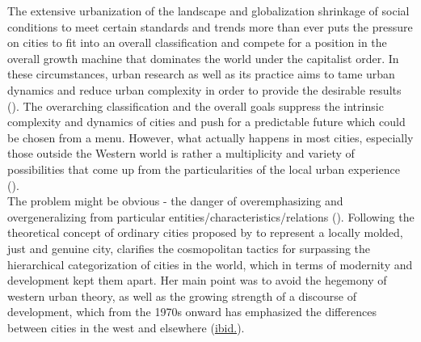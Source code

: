 \documentclass[11pt]{report}
\begin{document}
{{{The extensive urbanization of the landscape and globalization shrinkage of social conditions to meet certain standards and trends more than ever puts the pressure on cities to fit into an overall classification and compete for a position in the overall growth machine that dominates the world under the capitalist order.
In these circumstances, urban research as well as its practice aims to tame urban dynamics and reduce urban complexity in order to provide the desirable results
(\href{Jacobs}{\citealt{jacobs_cities_1985}}).
The overarching classification and the overall goals suppress the intrinsic complexity and dynamics of cities and push for a predictable future which could be chosen  from a menu. However, what actually happens in most cities, especially those outside the Western world is rather a multiplicity and variety of possibilities that come up from the particularities of the local urban experience (\href{Amin}{\citealt{amin_good_2006}}).
\\

The problem might be obvious - the danger of overemphasizing and overgeneralizing from particular entities/characteristics/relations (\href{Thrift}{\citealt{thrift_not_2000}}).
Following the theoretical concept of ordinary cities proposed by 
\href{Amin}{\cite{amin_ordinary_1997}}
to represent a locally molded, just and genuine city, \href{Robinson}{\cite{robinson_ordinary_2006}}
clarifies the cosmopolitan tactics for surpassing the hierarchical categorization of cities in the world, which in terms of modernity and development kept them apart. Her main point was to avoid the hegemony of western urban theory, as well as the growing strength of a discourse of development, which from the 1970s onward has emphasized the differences between cities in the west and elsewhere (\href{Robinson}{ibid.}). 
\\

}}}
\end{document}
